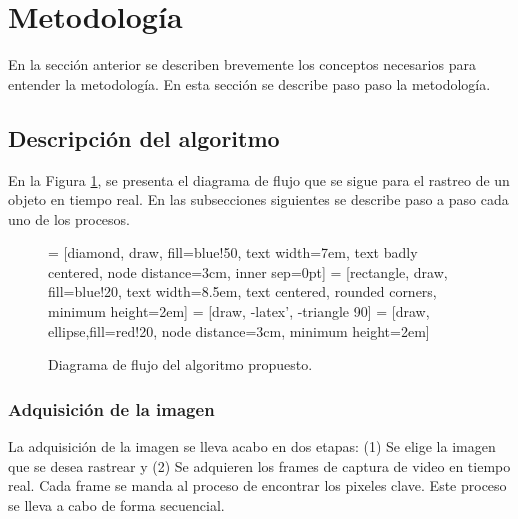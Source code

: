 \documentclass[a4paper]{article}
\begin{document}
\section{Metodología}
En la sección anterior se describen brevemente los conceptos necesarios para entender la metodología. En esta sección se describe paso paso la metodología.

\subsection{Descripción del algoritmo}
En la Figura \ref{fig2}, se presenta el diagrama de flujo que se sigue para el rastreo de un objeto en tiempo real. En las subsecciones siguientes se describe paso a paso cada uno de los procesos.

\begin{figure}
   = [diamond, draw, fill=blue!50, 
      text width=7em, text badly centered, node distance=3cm, inner sep=0pt]
   = [rectangle, draw, fill=blue!20, 
      text width=8.5em, text centered, rounded corners, minimum height=2em]
   = [draw, -latex', -triangle 90]
   = [draw, ellipse,fill=red!20, node distance=3cm,
      minimum height=2em]

  \centering
  \small
  \caption{Diagrama de flujo del algoritmo propuesto.}
  \label{fig2}
\end{figure}

\subsubsection{Adquisición de la imagen}
\label{sec1}
La adquisición de la imagen se lleva acabo en dos etapas: (1) Se elige la imagen que se desea rastrear y (2) Se adquieren los frames de captura de video en tiempo real. Cada frame se manda al proceso de encontrar los pixeles clave. Este proceso se lleva a cabo de forma secuencial. 
\end{document}
